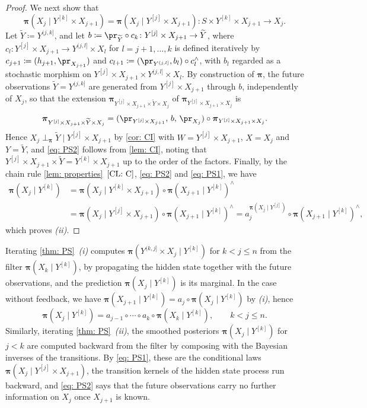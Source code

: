 \documentclass[12pt,reqno]{amsart}%
\def\wt#1{\widetilde{#1}}%
\theoremstyle{plain}
\theoremstyle{definition}
\def\bspi{\boldsymbol{\pi}}
\begin{document}
\begin{proof}
	We next show that
	\begin{equation}\label{eq: PS2}
		\bspi(X_j\mid Y^{[k]}\times X_{j+1})=\bspi(X_j\mid Y^{[j]}\times X_{j+1})\colon S\times Y^{[k]}\times X_{j+1}\rightarrow X_j.
	\end{equation}
	Let $\wt{Y}\coloneqq Y^{(j,k]}$, and let $b\coloneqq\pr_{\wt{Y}}\circ c_k\colon Y^{[j]}\times X_{j+1}\rightarrow \wt{Y}$,
	where $c_l\colon Y^{[j]}\times X_{j+1}\rightarrow Y^{(j,l]}\times X_l$ for $l=j+1,\ldots,k$
	is defined iteratively by $c_{j+1}\coloneqq(h_{j+1},\pr_{X_{j+1}})$ and
	$c_{l+1}\coloneqq(\pr_{Y^{(j,l]}},b_l)\circ c_l^\wedge$,
	with $b_l$ regarded as a stochastic morphism on $Y^{[j]}\times X_{j+1}\times Y^{(j,l]}\times X_l$.
	By construction of $\bspi$, the future observations $\wt{Y}=Y^{(j,k]}$ are generated from
	$Y^{[j]}\times X_{j+1}$ through $b$, independently of $X_j$, so that the extension
	$\bspi_{Y^{[j]}\times X_{j+1}\times \wt{Y}\times X_j}$ of $\bspi_{Y^{[j]}\times X_{j+1}\times X_j}$ is
	\[
		\bspi_{Y^{[j]}\times X_{j+1}\times \wt{Y}\times X_j}
		=(\pr_{Y^{[j]}\times X_{j+1}},\,b,\,\pr_{X_j})
		\circ\bspi_{Y^{[j]}\times X_{j+1}\times X_j}.
	\]
	Hence $X_j\perp_{\bspi}\wt{Y}\mid Y^{[j]}\times X_{j+1}$ by \cref{cor: CI}
	with $W=Y^{[j]}\times X_{j+1}$, $X=X_j$ and $Y=\wt{Y}$, and \eqref{eq: PS2} follows from \cref{lem: CI},
	noting that $Y^{[j]}\times X_{j+1}\times \wt{Y}=Y^{[k]}\times X_{j+1}$ up to the order of the factors.
	Finally, by the chain rule \cref{lem: properties}~$\ref{CL: C}$, \eqref{eq: PS2} and \eqref{eq: PS1}, we have
	\begin{align*}
		\bspi(X_j\mid Y^{[k]})
		&=\bspi(X_j\mid Y^{[k]}\times X_{j+1})\circ\bspi(X_{j+1}\mid Y^{[k]})^\wedge\\
		&=\bspi(X_j\mid Y^{[j]}\times X_{j+1})\circ\bspi(X_{j+1}\mid Y^{[k]})^\wedge
		=a_j^{\bspi(X_j\mid Y^{[j]})}\circ\bspi(X_{j+1}\mid Y^{[k]})^\wedge,
	\end{align*}
	which proves \textit{(ii)}.
\end{proof}

\begin{remark}
	Iterating \cref{thm: PS}~\textit{(i)} computes
	$\bspi(Y^{(k,j]}\times X_j\mid Y^{[k]})$ for $k<j\leq n$ from the filter $\bspi(X_k\mid Y^{[k]})$,
	by propagating the hidden state together with the future observations, and the prediction
	$\bspi(X_j\mid Y^{[k]})$ is its marginal.
	In the case without feedback, we have
	$\bspi(X_{j+1}\mid Y^{[k]})=a_j\circ \bspi(X_j\mid Y^{[k]})$ by \textit{(i)}, hence
	\[
		\bspi(X_j\mid Y^{[k]})=a_{j-1}\circ \cdots \circ a_k\circ \bspi(X_k\mid Y^{[k]}),\qquad k<j\leq n .
	\]
	Similarly, iterating \cref{thm: PS}~\textit{(ii)}, the smoothed posteriors $\bspi(X_j\mid Y^{[k]})$ for $j<k$ are
	computed backward from the filter by composing with the Bayesian inverses of the transitions.
	By \eqref{eq: PS1}, these are the conditional laws
	$\bspi(X_j\mid Y^{[j]}\times X_{j+1})$,
	the transition kernels of the hidden state process run backward, and
	\eqref{eq: PS2} says that the future observations carry no further information on $X_j$ once $X_{j+1}$ is known.
\end{remark}
\end{document}
